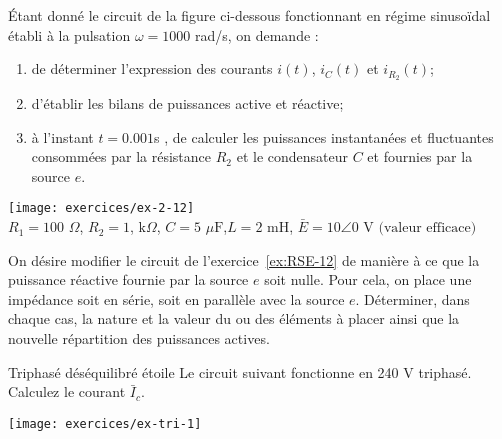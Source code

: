 \begin{exercise}{}\label{ex:RSE-12}
Étant donné le circuit de la figure ci-dessous fonctionnant en régime
sinusoïdal établi à la  pulsation $\omega=1000$ rad/s, on demande :
\begin{enumerate}
	\item de déterminer l'expression des courants $i(t)$, $i_C(t)$ et
	$i_{R_2}(t)$;
	\item d'établir les bilans de puissances active et réactive;
	\item à l'instant $t=0.001$s , de calculer les puissances
	instantanées et fluctuantes consommées par la résistance $R_2$ et le
	condensateur $C$ et fournies par la source $e$.
\end{enumerate}

\begin{center}
	\texttt{[image: exercices/ex-2-12]}\\
	$R_1=100\,\, \Omega$, $R_2=1$, $\mbox{k}\Omega$, $C=5\,\, \mu\mbox{F}$,$L = 2 \,\, \mbox{mH} $, $	\bar{E}=10\angle 0\,\, \mbox{V} \mbox{~(valeur efficace)}$
\end{center}


\end{exercise}

\begin{exercise}{}\label{ex:RSE-13}
On désire modifier le circuit de l'exercice~\ref{ex:RSE-12} de manière à
ce que la puissance réactive fournie par la source $e$ soit
nulle. Pour cela, on place une impédance soit en série, soit en
parallèle avec la source $e$. Déterminer, dans chaque cas, la nature
et la valeur du ou des éléments à placer ainsi que la nouvelle
répartition des puissances actives.

\end{exercise}

\begin{exercise}{Triphasé déséquilibré étoile}
\label{ex:tri-1} 
Le circuit suivant fonctionne en 240 V triphasé. Calculez le courant $\bar{I}_c$.
\begin{center}
	\texttt{[image: exercices/ex-tri-1]}
\end{center}

\end{exercise}

